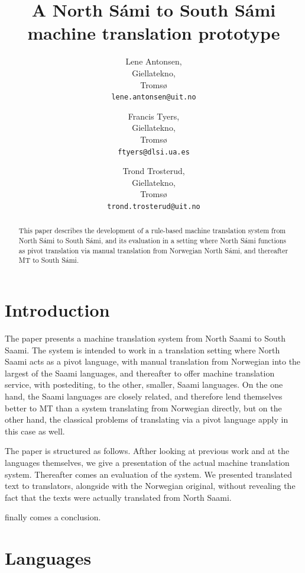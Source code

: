 \documentclass[a4paper,11pt,twocolumn]{article}
\title{A North Sámi to South Sámi machine translation prototype}
\author{Lene Antonsen,\\Giellatekno,\\Tromsø\\{\tt lene.antonsen@uit.no}
\and Francis Tyers,\\Giellatekno,\\Tromsø\\{\tt ftyers@dlsi.ua.es}
\and Trond Trosterud,\\Giellatekno,\\Tromsø\\{\tt trond.trosterud@uit.no}}
\date{}
\begin{document}
\maketitle


\begin{abstract}
This paper describes the development of a rule-based
machine translation system from North Sámi to South
Sámi, and its evaluation in a setting where North Sámi
functions as pivot translation via manual translation
from Norwegian North Sámi, and thereafter MT to South Sámi. 
\end{abstract}

\section{Introduction}

The paper presents a machine translation system from North Saami to
South Saami. The system is intended to work in a translation setting
where North Saami acts as a pivot language, with manual translation
from Norwegian into the largest of the Saami languages, and thereafter
to offer machine translation service, with postediting, to the other,
smaller, Saami languages. On the one hand, the Saami languages are
closely related, and therefore lend themselves better to MT than a
system translating from Norwegian directly, but on the other hand, the
classical problems of translating via a pivot language apply in this
case as well. 

The paper is structured as follows. Afther looking at previous work
and at the languages themselves, we give a presentation of the actual
machine translation system. Thereafter comes an evaluation of the
system. We presented translated text to translators, alongside with
the Norwegian original, without revealing the fact that the texts were
actually translated from North Saami.

finally comes a conclusion.


\cite{tyers09} \cite{wiechetek10} \cite{trosterud12}
\cite{AntonsenEtalReusing2010}

\cite{babych2007}

\section{Languages}
\end{document}

